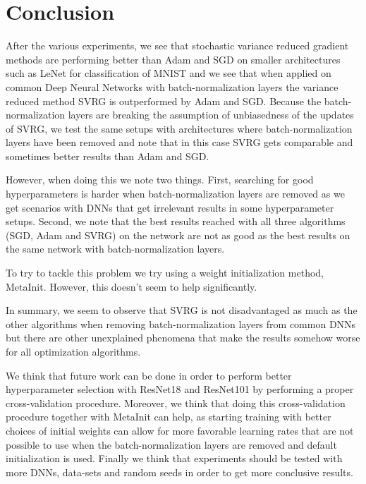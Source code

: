 \documentclass[a4paper,11pt,oneside]{report}
\begin{document}
\chapter{Conclusion}

After the various experiments, we see that stochastic variance reduced gradient methods are performing better than Adam and SGD on smaller architectures such as LeNet for classification of MNIST and we see that when applied on common Deep Neural Networks with batch-normalization layers the variance reduced method SVRG is outperformed by Adam and SGD.
Because the batch-normalization layers are breaking the assumption of unbiasedness of the updates of SVRG, we test the same setups with architectures where batch-normalization layers have been removed and note that in this case SVRG gets comparable and sometimes better results than Adam and SGD. 

However, when doing this we note two things. First, searching for good hyperparameters is harder when batch-normalization layers are removed as we get scenarios with DNNs that get irrelevant results in some hyperparameter setups. 
Second, we note that the best results reached with all three algorithms (SGD, Adam and SVRG) on the network are not as good as the best results on the same network with batch-normalization layers.

To try to tackle this problem we try using a weight initialization method, MetaInit. However, this doesn't seem to help significantly. 

In summary, we seem to observe that SVRG is not disadvantaged as much as the other algorithms when removing batch-normalization layers from common DNNs but there are other unexplained phenomena that make the results somehow worse for all optimization algorithms.

We think that future work can be done in order to perform better hyperparameter selection with ResNet18 and ResNet101 by performing a proper cross-validation procedure. 
Moreover, we think that doing this cross-validation procedure together with MetaInit can help, as starting training with better choices of initial weights can allow for more favorable learning rates that are not possible to use when the batch-normalization layers are removed and default initialization is used. Finally we think that experiments should be tested with more DNNs, data-sets and random seeds in order to get more conclusive results. 

\makeacks


\cleardoublepage
{}
{}
\printbibliography
\end{document}
